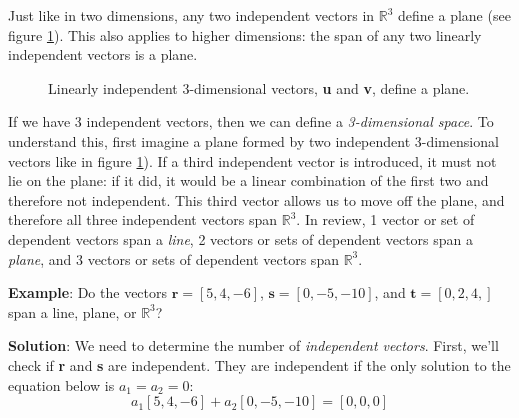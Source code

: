 Just like in two dimensions, any two independent vectors in $\mathbb{R}^3$ 
define a plane (see figure \ref{fig:plane}). This also applies to higher 
dimensions: the span of any two linearly independent vectors is a plane. 

\begin{figure}[htbp]
\centering
{}
\caption{Linearly independent 3-dimensional vectors, \textbf{u} and \textbf{v}, 
define a plane.}
\label{fig:plane}
\end{figure}

If we have 3 independent vectors, then we can define a \textit{3-dimensional 
space}. To understand this, first imagine a plane formed by two independent 
3-dimensional vectors like in figure \ref{fig:plane}). If a third independent 
vector is introduced, it must not lie on the plane: if it did, it would be a 
linear combination of the first two and therefore not independent. This third 
vector allows us to move off the plane, and therefore all three independent 
vectors span $\mathbb{R}^3$. In review, 1 vector or set of dependent vectors 
span a \textit{line}, 2 vectors or sets of dependent vectors span a 
\textit{plane}, and 3 vectors or sets of dependent vectors span $\mathbb{R}^3$. 

\textbf{Example}: Do the vectors $\mathbf{r} = \left[ 5, 4, -6 \right]$, 
$\mathbf{s} = \left[ 0, -5, -10 \right]$, and $\mathbf{t} = \left[ 0, 2, 4, 
\right]$ span a line, plane, or $\mathbb{R}^3$?

\textbf{Solution}: We need to determine the number of \textit{independent 
vectors}. First, we'll check if \textbf{r} and \textbf{s} are independent. 
They are independent if the only solution to the equation below is $a_1 = a_2 
= 0$:
$$a_1 \left[5, 4, -6 \right] + a_2 \left[ 0, -5, -10 \right] = \left[ 0, 0, 0 
\right]$$

